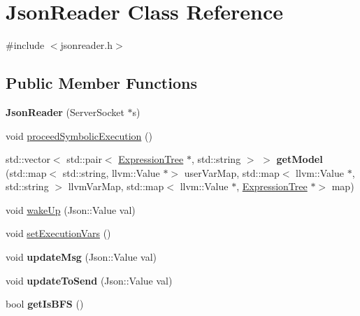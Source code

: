 \hypertarget{classJsonReader}{}\section{Json\+Reader Class Reference}
\label{classJsonReader}


{\ttfamily \#include $<$jsonreader.\+h$>$}

\subsection*{Public Member Functions}
\begin{DoxyCompactItemize}
\item 
{\bfseries Json\+Reader} (Server\+Socket $\ast$s)\hypertarget{classJsonReader_a8d208d52cd16840c1e3afa8a0fe4cff7}{}\label{classJsonReader_a8d208d52cd16840c1e3afa8a0fe4cff7}

\item 
void \hyperlink{classJsonReader_a7c50a43477f48349037ac20e273f7ff6}{proceed\+Symbolic\+Execution} ()
\item 
std\+::vector$<$ std\+::pair$<$ \hyperlink{classExpressionTree}{Expression\+Tree} $\ast$, std\+::string $>$ $>$ {\bfseries get\+Model} (std\+::map$<$ std\+::string, llvm\+::\+Value $\ast$$>$ user\+Var\+Map, std\+::map$<$ llvm\+::\+Value $\ast$, std\+::string $>$ llvm\+Var\+Map, std\+::map$<$ llvm\+::\+Value $\ast$, \hyperlink{classExpressionTree}{Expression\+Tree} $\ast$$>$ map)\hypertarget{classJsonReader_a39a4f69716af933b7cbbe03ba9272fc5}{}\label{classJsonReader_a39a4f69716af933b7cbbe03ba9272fc5}

\item 
void \hyperlink{classJsonReader_a8f1dd65b1cf1610f5ad18868f06af6f7}{wake\+Up} (Json\+::\+Value val)
\item 
void \hyperlink{classJsonReader_ad066f6b78eaec37b435b037905221723}{set\+Execution\+Vars} ()
\item 
void {\bfseries update\+Msg} (Json\+::\+Value val)\hypertarget{classJsonReader_ae35e70b8940df77393c895f592a24740}{}\label{classJsonReader_ae35e70b8940df77393c895f592a24740}

\item 
void {\bfseries update\+To\+Send} (Json\+::\+Value val)\hypertarget{classJsonReader_a941e49c66f126b489de8526e26154384}{}\label{classJsonReader_a941e49c66f126b489de8526e26154384}

\item 
bool {\bfseries get\+Is\+B\+FS} ()\hypertarget{classJsonReader_a0972908b79e404604ec653dd82a7fff4}{}\label{classJsonReader_a0972908b79e404604ec653dd82a7fff4}


\end{DoxyCompactItemize}
